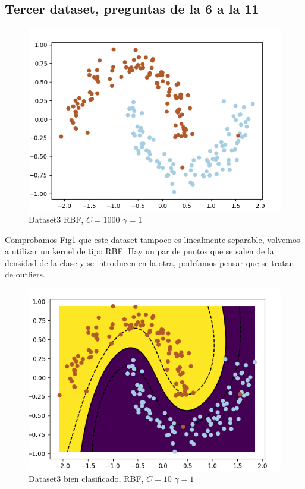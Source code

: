 \subsection{Tercer dataset, preguntas de la 6 a la 11}

\begin{figure}[H]
	\centering
	\includegraphics[scale=0.85]{img/dataset3_1}
    \caption{Dataset3 RBF, $C=1000$ $\gamma=1$}
    \label{dataset3_1}
\end{figure}

Comprobamos Fig\ref{dataset3_1} que este dataset tampoco es linealmente separable, volvemos a utilizar un kernel de tipo RBF. Hay un par de puntos que se salen de la densidad de la clase y se introducen en la otra, podríamos pensar que se tratan de outliers.

\begin{figure}[H]
	\centering
	\includegraphics[scale=0.85]{img/dataset3_2}
    \caption{Dataset3 bien clasificado, RBF, $C=10$ $\gamma=1$}
    \label{dataset3_2}
\end{figure}

